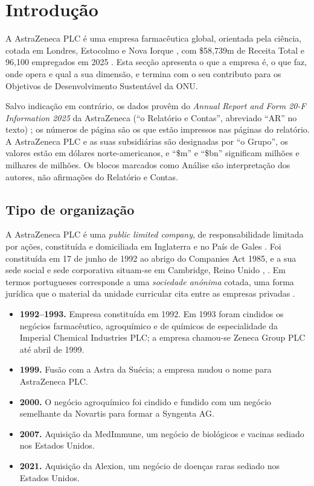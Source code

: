 \chapter{Introdução}

A AstraZeneca PLC é uma empresa farmacêutica global, orientada pela ciência, cotada em Londres, Estocolmo e Nova Iorque \cite[p.~71]{AR}, com \$58,739m de Receita Total \cite[p.~125]{AR} e 96,100 empregados em 2025 \cite[p.~27]{AR}. Esta secção apresenta o que a empresa é, o que faz, onde opera e qual a sua dimensão, e termina com o seu contributo para os Objetivos de Desenvolvimento Sustentável da ONU.

{\small\color{azmuted}
Salvo indicação em contrário, os dados provêm do \textit{Annual Report and Form 20-F Information 2025} da AstraZeneca (``o Relatório e Contas'', abreviado ``AR'' no texto) \cite{AR}; os números de página são os que estão impressos nas páginas do relatório. A AstraZeneca PLC e as suas subsidiárias são designadas por ``o Grupo'', os valores estão em dólares norte-americanos, e ``\$m'' e ``\$bn'' significam milhões e milhares de milhões. Os blocos marcados como Análise são interpretação dos autores, não afirmações do Relatório e Contas.
\par}

\section{Tipo de organização}

A AstraZeneca PLC é uma \textit{public limited company}, de responsabilidade limitada por ações, constituída e domiciliada em Inglaterra e no País de Gales \cite[p.~199]{AR}. Foi constituída em 17 de junho de 1992 ao abrigo do Companies Act 1985, e a sua sede social e sede corporativa situam-se em Cambridge, Reino Unido \cite[Item~4.A]{F20}, \cite[p.~230]{AR}. Em termos portugueses corresponde a uma \textit{sociedade anónima} cotada, uma forma jurídica que o material da unidade curricular cita entre as empresas privadas \cite[p.~5]{INT}.

\begin{itemize}[leftmargin=*]
\item \textbf{1992--1993.} Empresa constituída em 1992. Em 1993 foram cindidos os negócios farmacêutico, agroquímico e de químicos de especialidade da Imperial Chemical Industries PLC; a empresa chamou-se Zeneca Group PLC até abril de 1999. \cite[Item~4.A]{F20}
\item \textbf{1999.} Fusão com a Astra da Suécia; a empresa mudou o nome para AstraZeneca PLC. \cite[Item~4.A]{F20}
\item \textbf{2000.} O negócio agroquímico foi cindido e fundido com um negócio semelhante da Novartis para formar a Syngenta AG. \cite[Item~4.A]{F20}
\item \textbf{2007.} Aquisição da MedImmune, um negócio de biológicos e vacinas sediado nos Estados Unidos. \cite[Item~4.A]{F20}
\item \textbf{2021.} Aquisição da Alexion, um negócio de doenças raras sediado nos Estados Unidos. \cite[Item~4.A]{F20}
\end{itemize}

